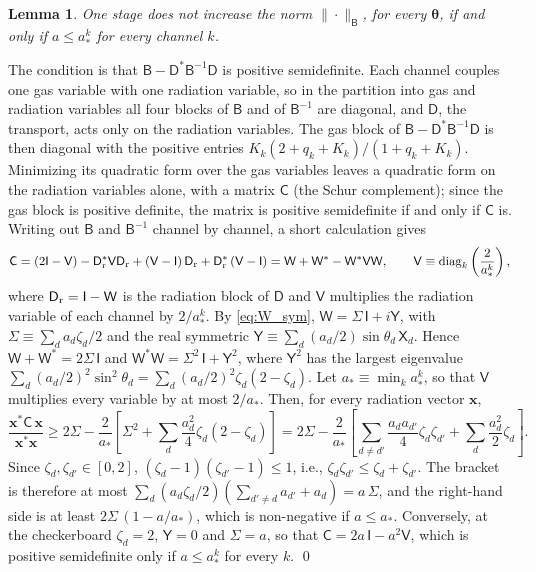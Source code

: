 \documentclass[preprint,12pt,authoryear]{elsarticle}
\newcommand{\tenI}{\mathsf{I}}
\providecommand{\tenD}{\mathsf{D}}
\providecommand{\tenB}{\mathsf{B}}
\newtheorem{lem}{Lemma}
\providecommand{\tenW}{\mathsf{W}}
\providecommand{\tenX}{\mathsf{X}}
\providecommand{\tenC}{\mathsf{C}}
\providecommand{\tenV}{\mathsf{V}}
\providecommand{\tenY}{\mathsf{Y}}
\begin{document}
\begin{appendix}
\begin{lem}
\label{lem:stage}
One stage does not increase the norm $\|\cdot\|_{\tenB}$, for every $\boldsymbol{\theta}$, if and only if $a \leq a_*^k$ for every channel $k$.
\end{lem}

\begin{pf}
The condition is that $\tenB - \tenD^*\tenB^{-1}\tenD$ is positive semidefinite. Each channel couples one gas variable with one radiation variable, so in the partition into gas and radiation variables all four blocks of $\tenB$ and of $\tenB^{-1}$ are diagonal, and $\tenD$, the transport, acts only on the radiation variables. The gas block of $\tenB - \tenD^*\tenB^{-1}\tenD$ is then diagonal with the positive entries $K_k(2 + q_k + K_k)/(1 + q_k + K_k)$. Minimizing its quadratic form over the gas variables leaves a quadratic form on the radiation variables alone, with a matrix $\tenC$ (the Schur complement); since the gas block is positive definite, the matrix is positive semidefinite if and only if $\tenC$ is. Writing out $\tenB$ and $\tenB^{-1}$ channel by channel, a short calculation gives
\begin{equation}
    \tenC = \left(2\tenI - \tenV\right) - \tenD_{\rm r}^*\tenV\tenD_{\rm r} + \left(\tenV - \tenI\right)\tenD_{\rm r} + \tenD_{\rm r}^*\left(\tenV - \tenI\right)
    = \tenW + \tenW^* - \tenW^*\tenV\tenW,
    \qquad
    \tenV \equiv \mathrm{diag}_k\left(\frac{2}{a_*^k}\right),
    \label{eq:schur_stage}
\end{equation}
where $\tenD_{\rm r} = \tenI - \tenW$ is the radiation block of $\tenD$ and $\tenV$ multiplies the radiation variable of each channel by $2/a_*^k$. By \autoref{eq:W_sym}, $\tenW = \Sigma\,\tenI + i\tenY$, with $\Sigma \equiv \sum_d a_d\zeta_d/2$ and the real symmetric $\tenY \equiv \sum_d (a_d/2)\sin\theta_d\,\tenX_d$. Hence $\tenW + \tenW^* = 2\Sigma\,\tenI$ and $\tenW^*\tenW = \Sigma^2\,\tenI + \tenY^2$, where $\tenY^2$ has the largest eigenvalue $\sum_d (a_d/2)^2\sin^2\theta_d = \sum_d (a_d/2)^2\zeta_d(2 - \zeta_d)$. Let $a_* \equiv \min_k a_*^k$, so that $\tenV$ multiplies every variable by at most $2/a_*$. Then, for every radiation vector $\mathbf{x}$,
\begin{equation}
    \frac{\mathbf{x}^*\tenC\,\mathbf{x}}{\mathbf{x}^*\mathbf{x}} \geq 2\Sigma - \frac{2}{a_*}\left[\Sigma^2 + \sum_d \frac{a_d^2}{4}\zeta_d(2 - \zeta_d)\right]
    = 2\Sigma - \frac{2}{a_*}\left[\sum_{d \neq d'}\frac{a_d a_{d'}}{4}\zeta_d\zeta_{d'} + \sum_d \frac{a_d^2}{2}\zeta_d\right] .
    \label{eq:schur_bound}
\end{equation}
Since $\zeta_d, \zeta_{d'} \in [0, 2]$, $(\zeta_d - 1)(\zeta_{d'} - 1) \leq 1$, i.e., $\zeta_d\zeta_{d'} \leq \zeta_d + \zeta_{d'}$. The bracket is therefore at most $\sum_d (a_d\zeta_d/2)\left(\sum_{d' \neq d} a_{d'} + a_d\right) = a\,\Sigma$, and the right-hand side is at least $2\Sigma\,(1 - a/a_*)$, which is non-negative if $a \leq a_*$. Conversely, at the checkerboard $\zeta_d = 2$, $\tenY = 0$ and $\Sigma = a$, so that $\tenC = 2a\,\tenI - a^2\tenV$, which is positive semidefinite only if $a \leq a_*^k$ for every $k$. \qed
\end{pf}


\end{appendix}
\end{document}
